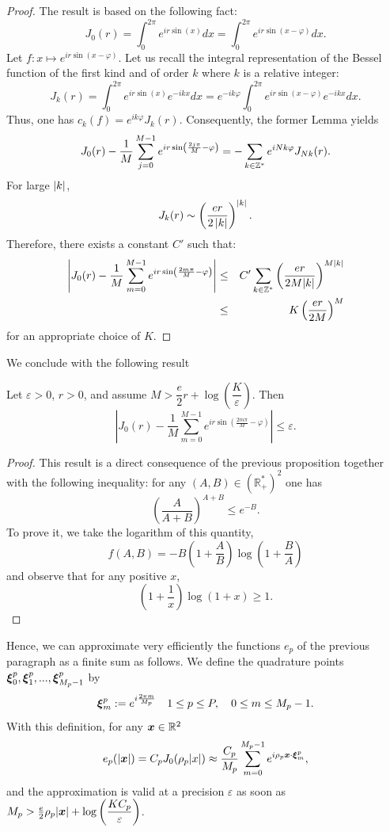 \documentclass{article}
\begin{document}
\begin{proof}
	The result is based on the following fact: 
	\[J_0(r) =  \int_0^{2\pi} e^{ir\sin(x)}dx = \int_0^{2\pi} e^{ir\sin(x - \varphi)}dx.\] 
	Let $f : x \mapsto e^{ir\sin(x - \varphi)}$. Let us recall the integral representation of the Bessel function of the first kind and of order $k$ where $k$ is a relative integer: \[J_k(r) =  \int_{0}^{2\pi}e^{ir\sin(x)}e^{-ikx}dx =  e^{-ik\varphi}\int_{0}^{2\pi}e^{ir\sin(x - \varphi)}e^{-ikx}dx.\] Thus, one has $c_k(f) = e^{ik\varphi}J_k(r)$. Consequently, the former Lemma yields 
	\[J_0(r) -  \dfrac{1}{M} \sum_{j=0}^{M-1} e^{ir \sin \left( \frac{2j\pi}{M}-\varphi \right)} = -\sum_{k\in \mathbb{Z}^*}e^{iNk\varphi}J_{Nk}(r).\] 
	For large $\left\lvert k \right\rvert$, 
	\[J_k(r) \sim \left(\dfrac{er}{2\left\lvert k \right\rvert}\right)^{\left\lvert k \right\rvert}.\]
	Therefore, there exists a constant $C'$ such that: 
	\begin{eqnarray*}
		\left\lvert J_0(r) -  \dfrac{1}{M}\sum_{m=0}^{M-1}e^{ir\sin\left(\frac{2m\pi}{M}-\varphi\right)} \right\rvert &\leq& C' \sum_{k\in \mathbb{Z}^*} \left(\dfrac{er}{2M|k|}\right)^{M|k|}\\
		&\leq& K \left(\dfrac{er}{2M}\right)^M 
	\end{eqnarray*}
	for an appropriate choice of $K$.	
	
\end{proof}
We conclude with the following result
\begin{proposition} Let $\varepsilon >0$, $r>0$, and assume $M > \dfrac{e}{2}r + \log\left(\dfrac{K}{\varepsilon}\right)$. Then 
	\[\left|J_0(r) -  \dfrac{1}{M}\sum_{m=0}^{M-1}e^{ir\sin\left(\frac{2m\pi}{M}-\varphi\right)} \right| \leq \varepsilon.\]
	\label{suboptCirc}
\end{proposition}
\begin{proof}
	This result is a direct consequence of the previous proposition together with the following inequality: for any $(A,B) \in \left(\mathbb{R}_+^*\right)^2$ one has
	\[ \left( \dfrac{A}{A+B}\right)^{A+B} \leq e^{-B}.\]
	To prove it, we take the logarithm of this quantity, 
	\[f(A,B) = -B\left(1+\dfrac{A}{B}\right)\log\left(1+\dfrac{B}{A}\right)\]
	and observe that for any positive $x$, \[\left(1+\dfrac{1}{x}\right)\log(1+x) \geq 1.\]
	
\end{proof}
																																																		
Hence, we can approximate very efficiently the functions $e_p$ of the previous paragraph as a finite sum as follows. We define the quadrature points $\boldsymbol{\xi}_0^p, \boldsymbol{\xi}_1^p, ..., \boldsymbol{\xi}^p_{M_p-1}$  by
\begin{equation}
	\label{defXimp}
	\boldsymbol{\xi}_m^p := \displaystyle e^{i\frac{2\pi m}{M_p}} \quad 1\leq p \leq P, \quad 0 \leq m \leq M_p -1.
\end{equation}
With this definition, for any $\boldsymbol{x} \in \mathbb{R}^2$
\[ e_p(|\boldsymbol{x}|) = C_p J_0(\rho_p |x|)\approx \dfrac{C_p}{M_p}\sum_{m=0}^{M_p-1}{e^{i \rho_p \boldsymbol{x} \cdot \boldsymbol{\xi}_m^p}},\]
and the approximation is valid at a precision $\varepsilon$ as soon as $M_p > \frac{e}{2}\rho_p|\boldsymbol{x}| + \log\left(\dfrac{KC_p}{\varepsilon}\right)$.
																																																		
\end{document}
